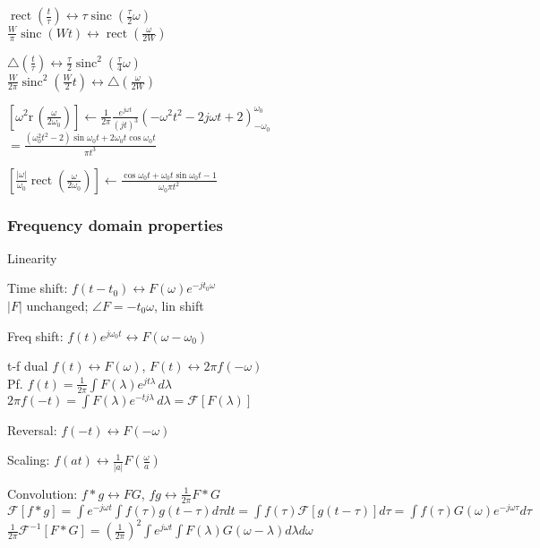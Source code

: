 \documentclass[4pt]{article}
\theoremstyle{definition}
\theoremstyle{definition}
\renewcommand{\r}{\mathrm{r}\,}
\renewcommand{\o}{\omega}
\newcommand{\lra}{\leftrightarrow}
\DeclareMathOperator{\rect}{rect}
\DeclareMathOperator{\sinc}{sinc}
\begin{document}
\begin{multicols}{3}
    $\rect(\frac t {\tau}) \lra \tau \sinc(\frac{\tau}{2}\omega)$\\ 
    $\frac W \pi \sinc(Wt) \lra \rect(\frac{\omega}{2W})$

    \(\triangle (\frac t {\tau}) \lra \frac{\tau}{2} \sinc^2 (\frac{\tau}{4}\omega)\)\\
    \(\frac{W}{2\pi} \sinc^2 (\frac{W}{2}t) \lra \triangle(\frac{\omega}{2W})\)

    \([\o^2 \r(\frac{\o}{2\o_0})] \leftarrow \frac{1}{2\pi} \frac{e^{j\o t}}{(jt)^3}(-\o^2t^2-2j\o t + 2)^{\o_0}_{-\o_0}\)\\
    \(=\frac{(\o_0^2 t^2 - 2)\sin \o_0 t + 2\o_0 t\cos \o_0 t}{\pi t^3}\)\

    \([\frac{|\o|}{\o_0} \rect(\frac{\o}{2\o_0})] \leftarrow \frac{\cos \o_0 t + \o_0 t \sin \o_0 t - 1}{\o_0 \pi t^2}\)
    \columnbreak
\subsubsection{Frequency domain properties}
    Linearity

    Time shift: \(f(t-t_0) \lra F(\omega) e^{-jt_0\omega}\) \\ %
    $|F|$ unchanged; $\angle F =- t_0\omega$, lin shift

    Freq shift: \(f(t) e^{j\omega_0 t} \lra F(\omega - \omega_0)\)  %

    t-f dual \(f(t) \lra F(\omega)\), \(F(t) \lra 2\pi f(-\omega)\)\\ 
    Pf. \(f(t) = \frac 1 {2\pi} \int F(\lambda) e^{jt\lambda}\, d\lambda\)\\
    \(2\pi f(-t) = \int F(\lambda) e^{-tj\lambda}\, d\lambda = \mathcal{F}[F(\lambda)]\)

    Reversal: \(f(-t)\lra F(-\o)\)

    Scaling: \(f(at)\lra \frac{1}{|a|}F(\frac{\o}{a})\)   %

    Convolution: \(f*g \lra FG\), \(fg \lra \frac{1}{2\pi} F*G\)\\
    \(\mathcal F[f*g] = \int e^{-j\o t} \int f(\tau) g(t-\tau)d\tau dt =\int f(\tau) \mathcal F[g(t-\tau)]  d\tau = \int f(\tau) G(\o)e^{-j\o\tau}d\tau\)\\
    \( \frac{1}{2\pi} \mathcal{F}^{-1}[F * G] = (\frac{1}{2\pi})^2 \int e^{j\o t} \int F(\lambda) G(\o - \lambda) d\lambda d\o\)


\end{multicols}
\end{document}
